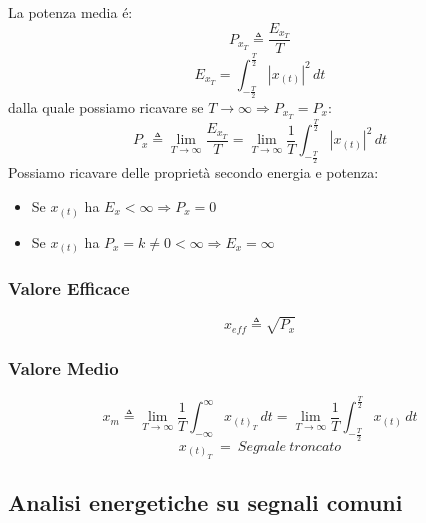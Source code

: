             La potenza media é:
            \[
                P_{x_{T}} \triangleq \frac{E_{x_{T}}}{T}    
            \]
            \[
                E_{x_{T}} = \int_{-\frac{T}{2}}^{\frac{T}{2}}  |x_{(t)}|^2 \,dt  
            \]
            dalla quale possiamo ricavare se $T \rightarrow \infty \Rightarrow P_{x_{T}} = P_{x}$:
            \[
                P_{x} \triangleq \lim_{T\rightarrow\infty} \frac{E_{x_{T}}}{T} =\lim_{T\rightarrow\infty} \frac{1}{T} \int_{-\frac{T}{2}}^{\frac{T}{2}}  |x_{(t)}|^2 \,dt    
            \]  
            Possiamo ricavare delle proprietà secondo energia e potenza:
            \begin{itemize}
                \item Se $x_{(t)}$ ha $E_x < \infty \Rightarrow P_x = 0$
                \item Se $x_{(t)}$ ha $P_x = k \neq 0 < \infty \Rightarrow E_x = \infty$
            \end{itemize}
        \subsubsection{Valore Efficace}\label{Valore Efficace}
                \[    
                    x_{eff} \triangleq \sqrt{P_{x}}
                \]
        
        \subsubsection{Valore Medio}\label{Valore medio}

                    \[
                        x_{m} \triangleq \lim_{T\rightarrow\infty} \frac{1}{T} \int_{-\infty}^{\infty}  x_{(t)_T} \,dt = \lim_{T\rightarrow\infty} \frac{1}{T} \int_{-\frac{T}{2}}^{\frac{T}{2}}  x_{(t)} \,dt 
                    \]
                    \[
                        x_{(t)_T}\ =\ Segnale\ troncato
                    \]
                    
    \subsection{Analisi energetiche su segnali comuni}
